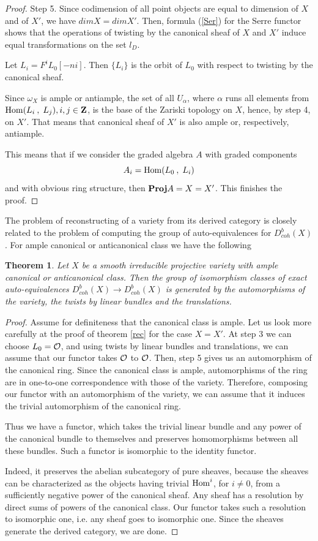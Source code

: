 \documentclass[12pt]{article}
\newtheorem{theorem}{Theorem}[section]
\def\db#1{ D^b_{coh}({#1})}
\def\h#1,#2{{\rm Hom}({#1}\:,\; {#2})}
\begin{document}
\begin{proof}
Step 5.  Since codimension of all point objects are equal to dimension of $X$ and of $X'$, we have $dimX=dimX'$. Then, formula (\ref{Ser}) for the Serre functor shows that the operations of twisting by the canonical sheaf of $X$ and $X'$ induce equal transformations on the set $l_D$.

Let $L_i=F^iL_0[-ni]$. Then $\{L_i\}$ is the orbit of $L_0$ with respect to twisting by the canonical sheaf.

Since $\omega_X$ is ample or antiample, the set of all $U_{\alpha}$, where ${\alpha}$ runs all elements from ${\h L_i, {L_j}}, i,j\in {\bf Z}$, is the base of the Zariski topology on $X$, hence, by step 4, on $X'$. That means that canonical sheaf of $X'$ is also ample or, respectively, antiample.

This means that if we consider the graded algebra $A$ with graded components
$$
A_i={\h L_0, {L_i}}
$$
and with obvious ring structure,
then ${\bf Proj}A=X=X'$. This finishes the proof.
\end{proof}

The problem of reconstructing of a variety from its derived category is closely related to the problem of computing the
group of auto-equivalences for $\db{X}$. For ample canonical or anticanonical class we have the following
\begin{theorem}\label{aut}
Let $X$ be a smooth irreducible projective variety with
ample canonical or anticanonical class. Then the group
of isomorphism classes of exact auto-equivalences $\db{X} \to
 \db{X} $ is generated by the automorphisms of the variety, the twists by linear bundles and the translations.
\end{theorem}

\begin{proof}
Assume for definiteness that the canonical class is ample.
Let us look more carefully at the proof of theorem \ref{rec}
for the case $X=X'$. At step 3 we can choose $L_{0}=\cal{O}$,
and using twists by linear bundles and translations, we can
assume that our functor takes  $\cal{O}$ to $\cal{O}$. Then, 
step 5 gives us an automorphism of the canonical ring. Since the canonical class is ample, automorphisms of the ring are in one-to-one correspondence with those of the variety.
Therefore, composing  our functor with an automorphism of the
 variety, we can assume that it induces the trivial automorphism
of the canonical ring. 

Thus we have a functor, which takes the
trivial linear bundle and any power of the canonical bundle to themselves and preserves homomorphisms between all these
bundles. Such a functor is isomorphic to the identity functor.

 Indeed, it preserves the abelian subcategory
of pure sheaves, because the sheaves can be characterized as
the objects having trivial ${\rm Hom}^{i}$, for $i\ne 0$, from  a sufficiently
negative power of the canonical sheaf. Any sheaf has a resolution by direct sums of powers of the canonical class.
Our functor takes such a resolution to  isomorphic one,
i.e. any sheaf goes to  isomorphic one. Since the sheaves
generate the derived category, we are done.
\end{proof}
\end{document}
